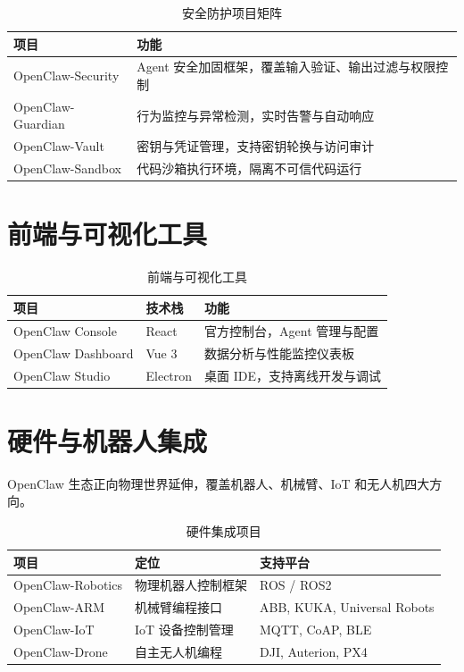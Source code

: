 \documentclass[
  customlatinfont = macos,
]{hkustthesis}
\begin{document}
\begin{table}[htbp]
\centering
\caption{安全防护项目矩阵}
\label{tab:security}
\begin{tabular}{@{}lp{8cm}@{}}
\toprule
\textbf{项目} & \textbf{功能} \\
\midrule
OpenClaw-Security  & Agent 安全加固框架，覆盖输入验证、输出过滤与权限控制 \\
OpenClaw-Guardian  & 行为监控与异常检测，实时告警与自动响应 \\
OpenClaw-Vault     & 密钥与凭证管理，支持密钥轮换与访问审计 \\
OpenClaw-Sandbox   & 代码沙箱执行环境，隔离不可信代码运行 \\
\bottomrule
\end{tabular}
\end{table}


\section{前端与可视化工具}

\begin{table}[htbp]
\centering
\caption{前端与可视化工具}
\label{tab:frontend}
\begin{tabular}{@{}llp{7cm}@{}}
\toprule
\textbf{项目} & \textbf{技术栈} & \textbf{功能} \\
\midrule
OpenClaw Console   & React    & 官方控制台，Agent 管理与配置    \\
OpenClaw Dashboard & Vue 3    & 数据分析与性能监控仪表板        \\
OpenClaw Studio    & Electron & 桌面 IDE，支持离线开发与调试    \\
\bottomrule
\end{tabular}
\end{table}


\section{硬件与机器人集成}

OpenClaw 生态正向物理世界延伸，覆盖机器人、机械臂、IoT 和无人机四大方向。

\begin{table}[htbp]
\centering
\caption{硬件集成项目}
\label{tab:hardware}
\begin{tabular}{@{}lp{5cm}p{5cm}@{}}
\toprule
\textbf{项目} & \textbf{定位} & \textbf{支持平台} \\
\midrule
OpenClaw-Robotics & 物理机器人控制框架       & ROS / ROS2          \\
OpenClaw-ARM      & 机械臂编程接口           & ABB, KUKA, Universal Robots \\
OpenClaw-IoT      & IoT 设备控制管理         & MQTT, CoAP, BLE     \\
OpenClaw-Drone    & 自主无人机编程           & DJI, Auterion, PX4  \\
\bottomrule
\end{tabular}
\end{table}
\end{document}
